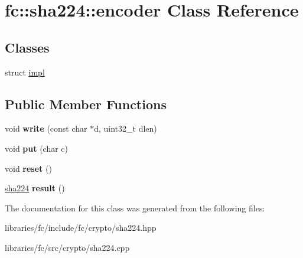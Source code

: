 \hypertarget{classfc_1_1sha224_1_1encoder}{}\section{fc\+:\+:sha224\+:\+:encoder Class Reference}
\label{classfc_1_1sha224_1_1encoder}
\subsection*{Classes}
\begin{DoxyCompactItemize}
\item 
struct \mbox{\hyperlink{structfc_1_1sha224_1_1encoder_1_1impl}{impl}}
\end{DoxyCompactItemize}
\subsection*{Public Member Functions}
\begin{DoxyCompactItemize}
\item 
\mbox{\label{classfc_1_1sha224_1_1encoder_a246235ad68c36207e5b696005a18ec89}} 
void {\bfseries write} (const char $\ast$d, uint32\+\_\+t dlen)
\item 
\mbox{\label{classfc_1_1sha224_1_1encoder_a3d50c4df8b4c7b34fd2a97e22893b25f}} 
void {\bfseries put} (char c)
\item 
\mbox{\label{classfc_1_1sha224_1_1encoder_a894ef9f1e56ff800aad34fa618b3ea3d}} 
void {\bfseries reset} ()
\item 
\mbox{\label{classfc_1_1sha224_1_1encoder_aa62372b5bf3593d69f5138f058a6b924}} 
\mbox{\hyperlink{classfc_1_1sha224}{sha224}} {\bfseries result} ()
\end{DoxyCompactItemize}


The documentation for this class was generated from the following files\+:\begin{DoxyCompactItemize}
\item 
libraries/fc/include/fc/crypto/sha224.\+hpp\item 
libraries/fc/src/crypto/sha224.\+cpp\end{DoxyCompactItemize}
